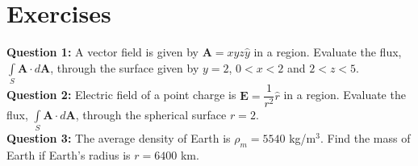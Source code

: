 \documentclass[12pt,a4paper]{article}
\begin{document}
\section{Exercises}
\noindent\textbf{Question 1:} A vector field is given by $\textbf{A}=xyz\hat y$ in a region. Evaluate the flux, $\int\limits_{S}\textbf{A}\cdot d\textbf{A}$, through the surface given by $y=2$, $0<x<2$ and $2<z<5$.\\[0.2cm]
\noindent\textbf{Question 2:} Electric field of a point charge is $\textbf{E}=\dfrac{1}{r^2}\hat r$ in a region. Evaluate the flux, $\int\limits_{S}\textbf{A}\cdot d\textbf{A}$, through the spherical surface $r=2$.\\[0.2cm]
\noindent\textbf{Question 3:} The average density of Earth is $\rho_m=5540$ kg/m$^3$. Find the mass of Earth if Earth's radius is $r=6400$ km.\\[0.2cm]


\end{document}
